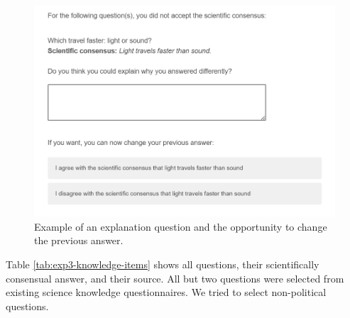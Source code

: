 \documentclass[
  doc,floatsintext]{apa6}
\begin{document}
\begin{figure}

{\centering \includegraphics[width=0.5\linewidth]{figures/study3_example_explanation} 

}

\caption{Example of an explanation question and the opportunity to change the previous answer.}\label{fig:exp3-explanation-example}
\end{figure}

Table \ref{tab:exp3-knowledge-items} shows all questions, their scientifically consensual answer, and their source. All but two questions were selected from existing science knowledge questionnaires. We tried to select non-political questions.

\begingroup\fontsize{8}{10}\selectfont
\end{document}
